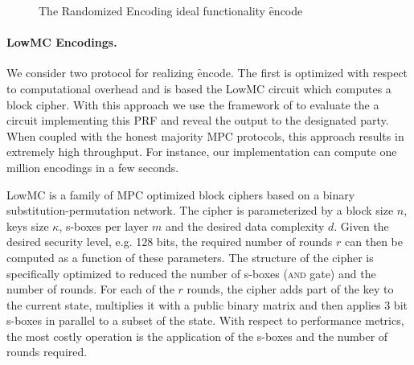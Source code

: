 \begin{figure}[ht]
	\caption{The Randomized Encoding ideal functionality \f{encode}}
	\label{fig:randomized-encode-ideal}	
\end{figure}


\paragraph{LowMC Encodings.}
We consider two protocol for realizing \f{encode}. The first is optimized with respect to computational overhead and is based the LowMC circuit\cite{lowmc} which computes a block cipher. With this approach we use the framework of \cite{aby3, highthroughput} to evaluate the a circuit implementing this PRF and reveal the output to the designated party. When coupled with the honest majority MPC protocols\cite{aby3, highthroughput}, this approach results in extremely high throughput. For instance, our implementation can compute one million encodings in a few seconds.

LowMC is a family of MPC optimized block ciphers based on a binary substitution-permutation network. The cipher is parameterized by a block size $n$, keys size $\kappa$, s-boxes per layer $m$ and the desired data complexity $d$. Given the desired security level, e.g. 128 bits, the required number of rounds $r$ can then be computed as a function of these parameters. The structure of the cipher is specifically optimized to reduced the number of s-boxes (\textsc{and} gate) and the number of rounds. For each of the $r$ rounds, the cipher adds part of the key to the current state, multiplies it with a public binary matrix and then applies 3 bit s-boxes in parallel to a subset of the state. With respect to performance metrics, the most costly operation is the application of the s-boxes and the number of rounds required. 

